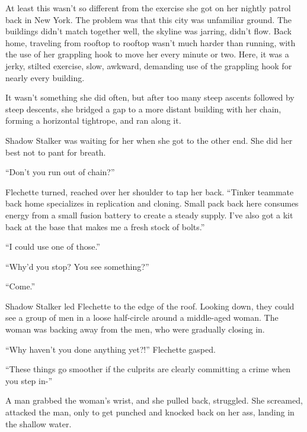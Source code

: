 At least this wasn't so different from the exercise she got on her nightly patrol back in New York.  The problem was that this city was unfamiliar ground.  The buildings didn't match together well, the skyline was jarring, didn't flow.  Back home, traveling from rooftop to rooftop wasn't much harder than running, with the use of her grappling hook to move her every minute or two.  Here, it was a jerky, stilted exercise, slow, awkward, demanding use of the grappling hook for nearly every building.



It wasn't something she did often, but after too many steep ascents followed by steep descents, she bridged a gap to a more distant building with her chain, forming a horizontal tightrope, and ran along it.



Shadow Stalker was waiting for her when she got to the other end.  She did her best not to pant for breath.



``Don't you run out of chain?''



Flechette turned, reached over her shoulder to tap her back. ``Tinker teammate back home specializes in replication and cloning.  Small pack back here consumes energy from a small fusion battery to create a steady supply.  I've also got a kit back at the base that makes me a fresh stock of bolts.''



``I could use one of those.''



``Why'd you stop?  You see something?''



``Come.''



Shadow Stalker led Flechette to the edge of the roof.  Looking down, they could see a group of men in a loose half-circle around a middle-aged woman.  The woman was backing away from the men, who were gradually closing in.



``Why haven't you done anything yet?!''  Flechette gasped.



``These things go smoother if the culprits are clearly committing a crime when you step in-''



A man grabbed the woman's wrist, and she pulled back, struggled.  She screamed, attacked the man, only to get punched and knocked back on her ass, landing in the shallow water.



